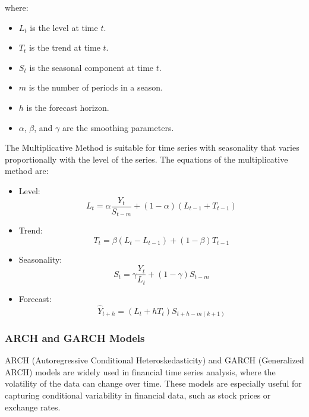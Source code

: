 where:
\begin{itemize}
    \item \( L_t \) is the level at time \( t \).
    \item \( T_t \) is the trend at time \( t \).
    \item \( S_t \) is the seasonal component at time \( t \).
    \item \( m \) is the number of periods in a season.
    \item \( h \) is the forecast horizon.
    \item \( \alpha \), \( \beta \), and \( \gamma \) are the smoothing parameters.
\end{itemize}

The Multiplicative Method is suitable for time series with seasonality that varies proportionally with the level of the series. The equations of the multiplicative method are:

\begin{itemize}
    \item Level:
    \begin{equation}
    L_t = \alpha \frac{Y_t}{S_{t-m}} + (1-\alpha)(L_{t-1} + T_{t-1})
    \end{equation}
    \item Trend:
    \begin{equation}
    T_t = \beta (L_t - L_{t-1}) + (1-\beta) T_{t-1}
    \end{equation}
    \item Seasonality:
    \begin{equation}
    S_t = \gamma \frac{Y_t}{L_t} + (1-\gamma) S_{t-m}
    \end{equation}
    \item Forecast:
    \begin{equation}
    \hat{Y}_{t+h} = (L_t + h T_t) S_{t+h-m(k+1)}
    \end{equation}
\end{itemize}
\vspace{10pt}

\subsubsection{ARCH and GARCH Models}

ARCH (Autoregressive Conditional Heteroskedasticity) and GARCH (Generalized ARCH) models are widely used in financial time series analysis, where the volatility of the data can change over time. These models are especially useful for capturing conditional variability in financial data, such as stock prices or exchange rates.
\vspace{10pt}

